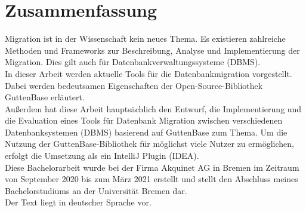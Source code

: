 \section*{Zusammenfassung}

Migration ist in der Wissenschaft kein neues Thema. Es existieren zahlreiche Methoden und Frameworks zur Beschreibung, Analyse und Implementierung der Migration. Dies gilt auch für Datenbankverwaltungssysteme (DBMS). \\ 
In dieser Arbeit werden aktuelle Tools für die Datenbankmigration vorgestellt. Dabei werden bedeutsamen Eigenschaften der Open-Source-Bibliothek GuttenBase erläutert.\\
Außerdem hat diese Arbeit hauptsächlich den Entwurf, die Implementierung und die Evaluation eines Tools für Datenbank Migration zwischen verschiedenen Datenbanksystemen (DBMS) basierend auf GuttenBase zum Thema.
Um die Nutzung der GuttenBase-Bibliothek für möglichst viele Nutzer zu ermöglichen, erfolgt die Umsetzung als ein IntelliJ Plugin (IDEA).\\ 
Diese Bachelorarbeit wurde bei der Firma Akquinet AG in Bremen im Zeitraum von September 2020 bis zum März 2021 erstellt und stellt den Abschluss meines Bachelorstudiums an der Universität Bremen dar. \\ 
Der Text liegt in deutscher Sprache vor.





